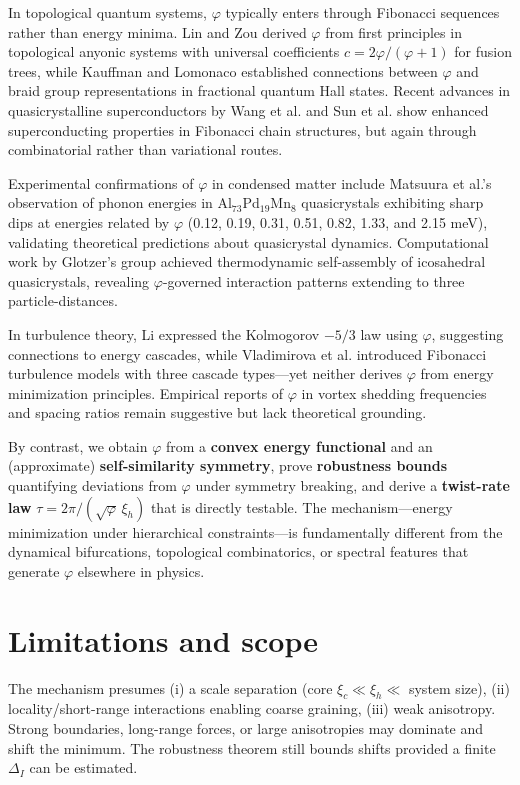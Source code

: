 \documentclass[11pt]{article}
\theoremstyle{remark}
\theoremstyle{definition}
\newcommand{\ph}{\varphi}
\begin{document}
In topological quantum systems, $\ph$ typically enters through Fibonacci sequences rather than energy minima. Lin and Zou \cite{lin2021} derived $\ph$ from first principles in topological anyonic systems with universal coefficients $c=2\ph/(\ph+1)$ for fusion trees, while Kauffman and Lomonaco \cite{kauffman2004} established connections between $\ph$ and braid group representations in fractional quantum Hall states. Recent advances in quasicrystalline superconductors by Wang et al. \cite{wang2024} and Sun et al. \cite{sun2023} show enhanced superconducting properties in Fibonacci chain structures, but again through combinatorial rather than variational routes.

Experimental confirmations of $\ph$ in condensed matter include Matsuura et al.'s \cite{matsuura2024} observation of phonon energies in Al$_{73}$Pd$_{19}$Mn$_8$ quasicrystals exhibiting sharp dips at energies related by $\ph$ (0.12, 0.19, 0.31, 0.51, 0.82, 1.33, and 2.15 meV), validating theoretical predictions about quasicrystal dynamics. Computational work by Glotzer's group \cite{glotzer2015} achieved thermodynamic self-assembly of icosahedral quasicrystals, revealing $\ph$-governed interaction patterns extending to three particle-distances.

In turbulence theory, Li \cite{li2013} expressed the Kolmogorov $-5/3$ law using $\ph$, suggesting connections to energy cascades, while Vladimirova et al. \cite{vladimirova2021} introduced Fibonacci turbulence models with three cascade types---yet neither derives $\ph$ from energy minimization principles. Empirical reports of $\ph$ in vortex shedding frequencies \cite{schewe1983} and spacing ratios remain suggestive but lack theoretical grounding.

By contrast, we obtain $\ph$ from a \textbf{convex energy functional} and an (approximate) \textbf{self-similarity symmetry}, prove \textbf{robustness bounds} quantifying deviations from $\ph$ under symmetry breaking, and derive a \textbf{twist-rate law} $\tau=2\pi/(\sqrt{\ph}\,\xi_h)$ that is directly testable. The mechanism---energy minimization under hierarchical constraints---is fundamentally different from the dynamical bifurcations, topological combinatorics, or spectral features that generate $\ph$ elsewhere in physics.

\section{Limitations and scope}
The mechanism presumes (i) a scale separation (core $\xi_c\ll\xi_h\ll$ system size), (ii) locality/short-range interactions enabling coarse graining, (iii) weak anisotropy. Strong boundaries, long-range forces, or large anisotropies may dominate and shift the minimum. The robustness theorem still bounds shifts provided a finite $\Delta_I$ can be estimated.
\end{document}
